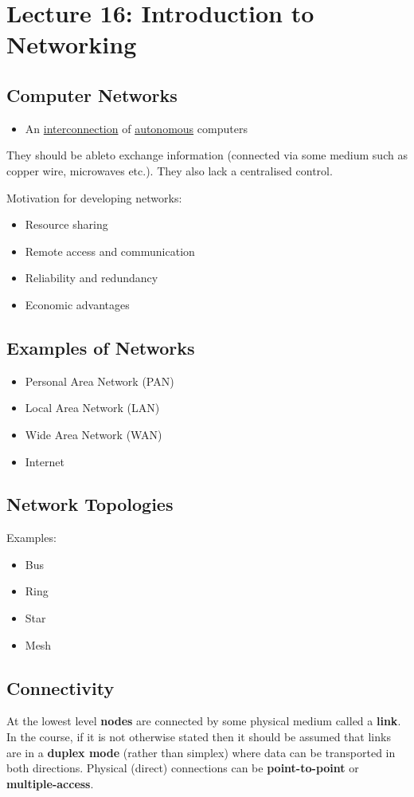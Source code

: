 \documentclass{article}%
\begin{document}
\section{Lecture 16: Introduction to Networking}


\subsection{Computer Networks}
\label{sec:orgdef3cb1}
\begin{itemize}
\item An \uline{interconnection} of \uline{autonomous} computers
\end{itemize}
They should be ableto exchange information (connected via some medium such as copper wire, microwaves etc.).
They also lack a centralised control.

Motivation for developing networks:
\begin{itemize}
\item Resource sharing
\item Remote access and communication
\item Reliability and redundancy
\item Economic advantages
\end{itemize}

\subsection{Examples of Networks}
\label{sec:org0270caa}
\begin{itemize}
\item Personal Area Network (PAN)
\item Local Area Network (LAN)
\item Wide Area Network (WAN)
\item Internet
\end{itemize}

\subsection{Network Topologies}
\label{sec:org443b66f}
Examples:
\begin{itemize}
\item Bus
\item Ring
\item Star
\item Mesh
\end{itemize}

\subsection{Connectivity}
\label{sec:orgbb7b840}
At the lowest level \textbf{nodes} are connected by some physical medium called a \textbf{link}.
In the course, if it is not otherwise stated then it should be assumed that links are in a \textbf{duplex mode} (rather than simplex) where data can be transported in both directions.
Physical (direct) connections can be \textbf{point-to-point} or \textbf{multiple-access}.
\end{document}
